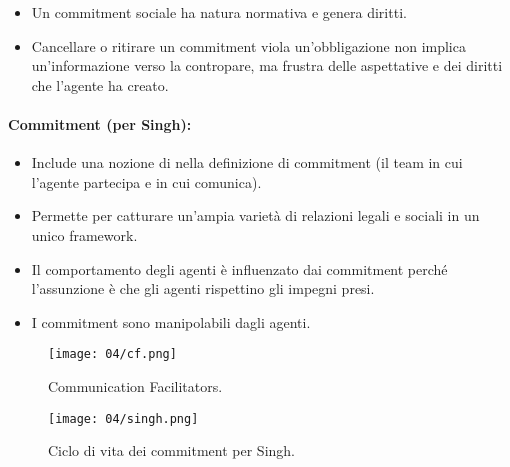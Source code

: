 \begin{itemize}
  \item Un commitment sociale ha natura normativa e genera diritti. 
  \item Cancellare o ritirare un commitment viola un'obbligazione non implica un'informazione verso la contropare, ma frustra delle aspettative e dei diritti che l'agente ha creato.
\end{itemize}

\paragraph{Commitment (per Singh):}

\begin{itemize}
  \item Include una nozione di  nella definizione di commitment (il team in cui l'agente partecipa e in cui comunica). 
  \item Permette  per catturare un'ampia varietà di relazioni legali e sociali in un unico framework. 
  \item Il comportamento degli agenti è influenzato dai commitment perché l'assunzione è che gli agenti rispettino gli impegni presi. 
  \item I commitment sono manipolabili dagli agenti.
\end{itemize}

\begin{figure}[!h]
    \centering
    \texttt{[image: 04/cf.png]}
  \caption{Communication Facilitators.}
\end{figure}

\begin{figure}[!h]
    \centering
    \texttt{[image: 04/singh.png]}
  \caption{Ciclo di vita dei commitment per Singh.}
\end{figure}

